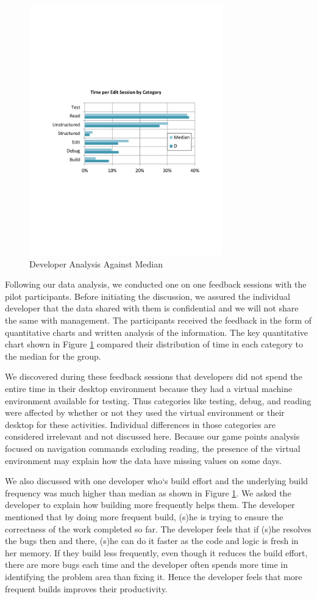 \documentclass{sig-alternate}
\begin{document}
\begin{figure}
	\includegraphics[width=3.3in]{developerEmedian.pdf}
	\caption{Developer Analysis Against Median}
	\label{fig:developercomparison}
\end{figure}


Following our data analysis, we conducted one on one feedback sessions with the pilot participants. Before initiating the discussion, we assured the individual developer that the data shared with them is confidential and we will not share the same with management. The participants received the feedback in the form of quantitative charts and written analysis of the information.  The key quantitative chart shown in Figure \ref{fig:developercomparison} compared their distribution of time in each category to the median for the group.   

We discovered during these feedback sessions that developers did not spend the entire time in their desktop environment because they had a virtual machine environment available for testing. Thus categories like testing, debug, and reading were affected by whether or not they used the virtual environment or their desktop for these activities.  Individual differences in those categories are considered irrelevant and not discussed here. Because our game points analysis focused on navigation commands excluding reading, the presence of the virtual environment may explain how the data have missing values on some days.  

We also discussed with one developer who`s build effort and the underlying build frequency was much higher than median as shown in Figure \ref{fig:developercomparison}.  We asked the developer to explain how building more frequently helps them. The developer mentioned that by doing more frequent build, (s)he is trying to ensure the correctness of the work completed so far. The developer feels that if (s)he resolves the bugs then and there, (s)he can do it faster as the code and logic is fresh in her memory. If they build less frequently, even though it reduces the build effort, there are more bugs each time and the developer often spends more time in identifying the problem area than fixing it. Hence the developer feels that more frequent builds improves their productivity.  
\end{document}
